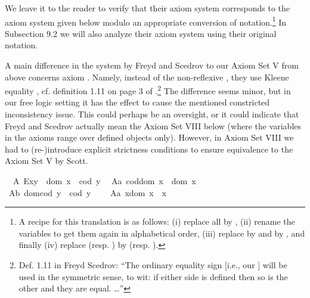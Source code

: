 \begin{isabellebody}
\begin{isamarkuptext}
  We leave it to the reader to verify that their axiom system corresponds to the 
  axiom system given below modulo an appropriate conversion of notation.\footnote{A recipe for 
  this translation is as follows: (i) replace all  by , 
(ii) rename the variables to get them again in alphabetical order,
(iii) replace \isa{{\isasymphi}{\isasymbox}} by  and \isa{{\isasymbox}{\isasymphi}}  by , and finally
(iv) replace  (resp. ) 
   by  (resp. ).}
  In Subsection 9.2 we will also analyze their axiom system using their original notation.


  A main difference in the system by Freyd and Scedrov to our Axiom Set V from above concerns
  axiom . Namely, instead of the non-reflexive \isa{{\isasymsimeq}}, they use Kleene 
  equality \isa{{\isasymcong}}, cf. definition 1.11 on page 3 of \cite{FreydScedrov90}.\footnote{Def. 1.11 in Freyd 
  Scedrov: ``The ordinary equality sign \isa{{\isacharequal}} [i.e., our \isa{{\isasymcong}}] will be used in the
  symmetric sense, to wit: if either side is defined then so is the other and they are equal. \ldots''} 
  The difference seems minor, but in our free logic setting it has the effect to cause the mentioned
  constricted inconsistency issue. This could perhaps be an oversight, or it could indicate
  that Freyd and Scedrov actually mean the Axiom Set VIII below (where the variables in the axioms range 
  over defined objects only). However, in Axiom Set VIII we had to (re-)introduce explicit 
  strictness conditions to ensure equivalence to the Axiom Set V by Scott.%
\end{isamarkuptext}\isamarkuptrue%
%
\isamarkuptrue%
\ \ A{}{\isacharcolon}\ {\isachardoublequoteopen}E{\isacharparenleft}x{\isasymcdot}y{\isacharparenright}\ \isactrlbold {\isasymleftrightarrow}\ dom\ x\ {\isasymsimeq}\ cod\ y{\isachardoublequoteclose}\ \isanewline
\ A{}a{\isacharcolon}\ {\isachardoublequoteopen}cod{\isacharparenleft}dom\ x{\isacharparenright}\ {\isasymcong}\ dom\ x{\isachardoublequoteclose}\ \ \ \isanewline
\ A{}b{\isacharcolon}\ {\isachardoublequoteopen}dom{\isacharparenleft}cod\ y{\isacharparenright}\ {\isasymcong}\ cod\ y{\isachardoublequoteclose}\ \ \ \isanewline
\ A{}a{\isacharcolon}\ {\isachardoublequoteopen}x{\isasymcdot}{\isacharparenleft}dom\ x{\isacharparenright}\ {\isasymcong}\ x{\isachardoublequoteclose}\ \ \isanewline

\end{isabellebody}
